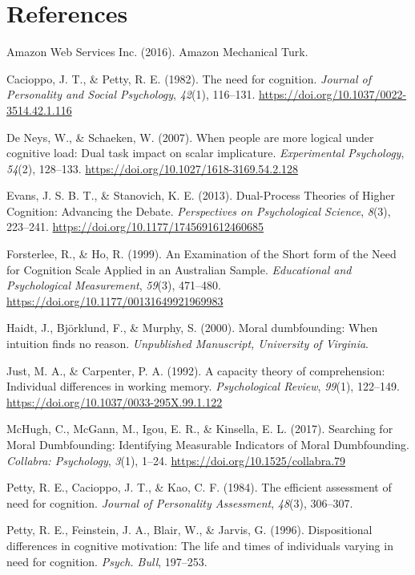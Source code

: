 \documentclass[
  american,
  man,floatsintext]{apa7}
\begin{document}
\hypertarget{references}{%
\section{References}\label{references}}

\setlength{\parindent}{-0.5in}
\setlength{\leftskip}{0.5in}
\setlength{\parskip}{8pt}

\hypertarget{refs}{}
\leavevmode\hypertarget{ref-amazonwebservicesinc._amazon_2016}{}%
Amazon Web Services Inc. (2016). Amazon Mechanical Turk.

\leavevmode\hypertarget{ref-cacioppo_need_1982}{}%
Cacioppo, J. T., \& Petty, R. E. (1982). The need for cognition. \emph{Journal of Personality and Social Psychology}, \emph{42}(1), 116--131. \url{https://doi.org/10.1037/0022-3514.42.1.116}

\leavevmode\hypertarget{ref-deneys_when_2007}{}%
De Neys, W., \& Schaeken, W. (2007). When people are more logical under cognitive load: Dual task impact on scalar implicature. \emph{Experimental Psychology}, \emph{54}(2), 128--133. \url{https://doi.org/10.1027/1618-3169.54.2.128}

\leavevmode\hypertarget{ref-evans_dualprocess_2013}{}%
Evans, J. S. B. T., \& Stanovich, K. E. (2013). Dual-Process Theories of Higher Cognition: Advancing the Debate. \emph{Perspectives on Psychological Science}, \emph{8}(3), 223--241. \url{https://doi.org/10.1177/1745691612460685}

\leavevmode\hypertarget{ref-forsterlee_examination_1999}{}%
Forsterlee, R., \& Ho, R. (1999). An Examination of the Short form of the Need for Cognition Scale Applied in an Australian Sample. \emph{Educational and Psychological Measurement}, \emph{59}(3), 471--480. \url{https://doi.org/10.1177/00131649921969983}

\leavevmode\hypertarget{ref-haidt_moral_2000}{}%
Haidt, J., Björklund, F., \& Murphy, S. (2000). Moral dumbfounding: When intuition finds no reason. \emph{Unpublished Manuscript, University of Virginia}.

\leavevmode\hypertarget{ref-just_capacity_1992}{}%
Just, M. A., \& Carpenter, P. A. (1992). A capacity theory of comprehension: Individual differences in working memory. \emph{Psychological Review}, \emph{99}(1), 122--149. \url{https://doi.org/10.1037/0033-295X.99.1.122}

\leavevmode\hypertarget{ref-mchugh_searching_2017a}{}%
McHugh, C., McGann, M., Igou, E. R., \& Kinsella, E. L. (2017). Searching for Moral Dumbfounding: Identifying Measurable Indicators of Moral Dumbfounding. \emph{Collabra: Psychology}, \emph{3}(1), 1--24. \url{https://doi.org/10.1525/collabra.79}

\leavevmode\hypertarget{ref-petty_efficient_1984}{}%
Petty, R. E., Cacioppo, J. T., \& Kao, C. F. (1984). The efficient assessment of need for cognition. \emph{Journal of Personality Assessment}, \emph{48}(3), 306--307.

\leavevmode\hypertarget{ref-petty_dispositional_1996}{}%
Petty, R. E., Feinstein, J. A., Blair, W., \& Jarvis, G. (1996). Dispositional differences in cognitive motivation: The life and times of individuals varying in need for cognition. \emph{Psych. Bull}, 197--253.
\end{document}
